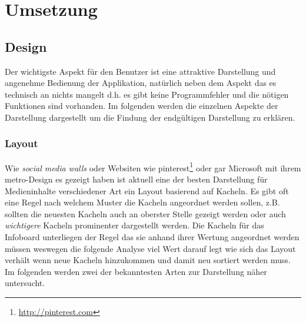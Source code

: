 \documentclass[12pt,twoside]{book}
\begin{document}
\chapter{Umsetzung}

\section{Design}

Der wichtigste Aspekt für den Benutzer ist eine attraktive Darstellung und angenehme Bedienung der Applikation, natürlich neben dem Aspekt das es technisch an nichts mangelt d.h. es gibt keine Programmfehler und die nötigen Funktionen sind vorhanden. Im folgenden werden die einzelnen Aspekte der Darstellung dargestellt um die Findung der endgültigen Darstellung zu erklären.

\subsection{Layout}

Wie \textit{social media walls} oder Websiten wie pinterest\footnote{\url{http://pinterest.com}} oder gar Microsoft mit ihrem metro-Design es gezeigt haben ist aktuell eine der besten Darstellung für Medieninhalte verschiedener Art ein Layout basierend auf Kacheln. Es gibt oft eine Regel nach welchem Muster die Kacheln angeordnet werden sollen, z.B. sollten die neuesten Kacheln auch an oberster Stelle gezeigt werden oder auch \textit{wichtigere} Kacheln prominenter dargestellt werden. Die Kacheln für das Infoboard unterliegen der Regel das sie anhand ihrer Wertung angeordnet werden müssen weswegen die folgende Analyse viel Wert darauf legt wie sich das Layout verhält wenn neue Kacheln hinzukommen und damit neu sortiert werden muss. Im folgenden werden zwei der bekanntesten Arten zur Darstellung näher untersucht.
\end{document}
